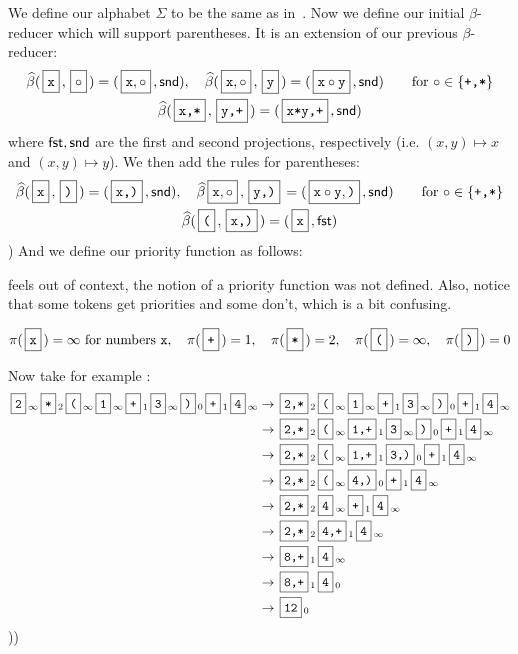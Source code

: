 \documentclass{llncs}
\newcommand{\yoni}[1]{{\begin{mdframed}[linecolor=red]{\color{red}#1}\end{mdframed}}}
\begin{document}
\begin{example}
We define our alphabet $\Sigma$ to be the same as in~.
Now we define our initial $\beta$-reducer which will support parentheses.
It is an extension of our previous $\beta$-reducer:
\begin{gather*}
    \hb(\mbt x,\mb\circ) = (\mb{\ttt x,\circ},\snd),\quad \hb(\mb{\ttt x,\circ},\mbt y) = (\mb{\ttt x\circ\ttt y},\snd) \qquad \hbox{for $\circ\in\set{\ttt{+,*}}$} \\
    \hb(\mbt{x,*},\mbt{y,+}) = (\mbt{x*y,+},\snd)
\end{gather*}
where $\mathsf{fst},\mathsf{snd}$ are the first and second projections, respectively (i.e. $(x,y)\mapsto x$ and $(x,y)\mapsto y$).
We then add the rules for parentheses:
\begin{gather*}
    \hb(\mbt x,\mbt)) = (\mbt{x,)},\snd),\quad \hb{\mb{\ttt x,\circ},\mbt{y,)}} = (\mb{\ttt x\circ\ttt y,\ttt)},\snd) \qquad \hbox{for $\circ\in\set{\ttt{+,*}}$} \\
    \hb(\mbt(,\mbt{x,)}) = (\mbt x,\fst)
\end{gather*}
\gobble) %
And we define our priority function as follows:
\yoni{feels out of context, the notion of a priority function
was not defined. Also, notice that some tokens get priorities and some don't, which is a bit confusing.}
\[ \pi(\mbt x) = \infty\hbox{ for numbers \ttt x},\quad \pi(\mbt+) = 1,\quad \pi(\mbt*) = 2,\quad \pi(\mbt() = \infty,\quad \pi(\mbt)) = 0 \]

Now take for example :
\begin{align*}
    \mbt2_\oo \mbt*_2 \mbt(_\oo \mbt1_\oo \mbt+_1 \mbt3_\oo \mbt)_0 \mbt+_1 \mbt4_\oo &\to \mbt{2,*}_2 \mbt(_\oo \mbt1_\oo \mbt+_1 \mbt3_\oo \mbt)_0 \mbt+_1 \mbt4_\oo\\
        &\to \mbt{2,*}_2 \mbt(_\oo \mbt{1,+}_1 \mbt3_\oo \mbt)_0\mbt+_1 \mbt4_\oo\\
        &\to \mbt{2,*}_2 \mbt(_\oo \mbt{1,+}_1 \mbt{3,)}_0 \mbt+_1 \mbt4_\oo\\
        &\to \mbt{2,*}_2 \mbt(_\oo \mbt{4,)}_0 \mbt+_1 \mbt4_\oo\\
        &\to \mbt{2,*}_2 \mbt4_\oo \mbt+_1 \mbt4_\oo\\
        &\to \mbt{2,*}_2 \mbt{4,+}_1 \mbt4_\oo\\
        &\to \mbt{8,+}_1 \mbt4_\oo\\
        &\to \mbt{8,+}_1 \mbt4_0\\
        &\to \mbt{12}_0
\end{align*}
\gobble)\gobble)

\end{example}
\end{document}
